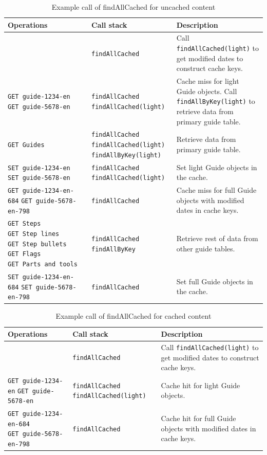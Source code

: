 \documentclass[12pt]{ucthesis}
\begin{document}
\begin{table}[h]
\begin{center}
\begin{tabular}{| p{} | p{} | p{} |}
   \hline
   Operations & Call stack & Description \\ \hline
   ~ &
   {\tt findAllCached} &
   Call {\tt findAllCached(light)} to get modified dates to construct cache keys.
   \\ \hline
   {\tt GET~guide-1234-en} {\tt GET~guide-5678-en} &
   {\tt findAllCached} {\tt findAllCached(light)} &
   Cache miss for light Guide objects. Call {\tt findAllByKey(light)} to retrieve data from primary guide table.
   \\ \hline
   {\tt GET~Guides} &
   {\tt findAllCached} {\tt findAllCached(light)} {\tt findAllByKey(light)} &
   Retrieve data from primary guide table.
   \\ \hline
   {\tt SET~guide-1234-en} {\tt SET~guide-5678-en} &
   {\tt findAllCached} {\tt findAllCached(light)} &
   Set light Guide objects in the cache.
   \\ \hline
   {\tt GET~guide-1234-en-684} {\tt GET~guide-5678-en-798} &
   {\tt findAllCached} &
   Cache miss for full Guide objects with modified dates in cache keys.
   \\ \hline
   {\tt GET~Steps} {\tt GET~Step~lines} {\tt GET~Step~bullets} {\tt GET~Flags} {\tt GET~Parts~and~tools} &
   {\tt findAllCached} {\tt findAllByKey} &
   Retrieve rest of data from other guide tables.
   \\ \hline
   {\tt SET~guide-1234-en-684} {\tt SET~guide-5678-en-798} &
   {\tt findAllCached} &
   Set full Guide objects in the cache.
   \\ \hline
\end{tabular}
\end{center}
\caption{Example call of findAllCached for uncached content}
\label{tab:findAllCachedUncachedExample}
\end{table}

\begin{table}[h]
\begin{center}
\begin{tabular}{| p{} | p{} | p{} |}
   \hline
   Operations & Call stack & Description \\ \hline
   ~ &
   {\tt findAllCached} &
   Call {\tt findAllCached(light)} to get modified dates to construct cache keys.
   \\ \hline
   {\tt GET~guide-1234-en} {\tt GET~guide-5678-en} &
   {\tt findAllCached} {\tt findAllCached(light)} &
   Cache hit for light Guide objects.
   \\ \hline
   {\tt GET~guide-1234-en-684} {\tt GET~guide-5678-en-798} &
   {\tt findAllCached} &
   Cache hit for full Guide objects with modified dates in cache keys.
   \\ \hline
\end{tabular}
\end{center}
\caption{Example call of findAllCached for cached content}
\label{tab:findAllCachedCachedExample}
\end{table}
\end{document}
